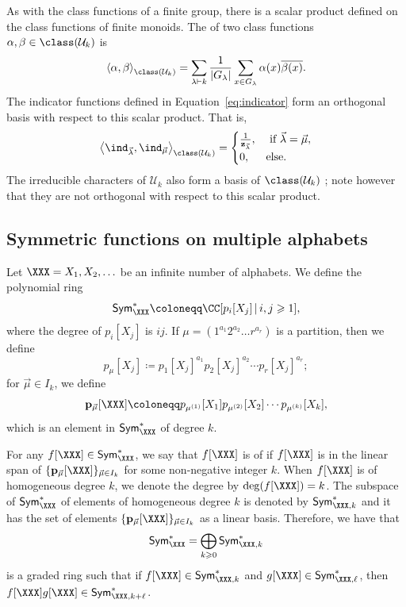 As with the class functions of a finite group, there is a scalar product
defined on the class functions of finite monoids.
The  of two class functions $\alpha, \beta \in \class(\mathcal{U}_k)$
is
\begin{equation}\label{eq:defspclass}
\left< \alpha, \beta \right>_{\class(\mathcal{U}_k)} =
\sum_{\lambda \vdash k} \frac{1}{|G_{\lambda}|} \sum_{x \in G_{\lambda}} \alpha(x) \overline{\beta(x)}.
\end{equation}
The indicator functions defined in Equation~\ref{eq:indicator} form an orthogonal basis
with respect to this scalar product.  That is,
$$
    \left< \ind_{\vec{\lambda}}, \ind_{\vec{\mu}} \right>_{\class(\mathcal{U}_k)}
    = \begin{cases}\frac{1}{\mathbf{z}_{\vec{\lambda}}}, &\hbox{ if }\vec{\lambda} = \vec{\mu},\\
    0, & \hbox{else.}\end{cases}
$$
The irreducible characters of $\mathcal{U}_k$ also form a basis of $\class(\mathcal{U}_k)$
\cite[Proposition 7.9 and 7.10]{Steinberg.2016};
note however that they are not orthogonal with respect to this
scalar product.

\subsection{Symmetric functions on multiple alphabets}
Let $\XXX = X_1, X_2, \ldots$ be an infinite number of alphabets.  We define the polynomial ring
\[
    \mathsf{Sym}^\ast_\XXX \coloneqq \CC[p_i[X_j]\, |\, i,j\geqslant 1],
\]
where the degree of $p_i[X_j]$ is $ij$.  If $\mu = (1^{a_1}2^{a_2}\ldots r^{a_r})$ is a partition,
then we define
$$p_\mu[X_j] \coloneqq p_1[X_j]^{a_1} p_2[X_j]^{a_2} \cdots p_r[X_j]^{a_r};$$
for $\vec{\mu} \in I_k$, we define
$$\mathbf{p}_{\vec{\mu}}[\XXX] \coloneqq p_{\mu^{(1)}}[X_1] p_{\mu^{(2)}}[X_2] \cdots p_{\mu^{(k)}}[X_k],$$
which is an element in $\mathsf{Sym}^\ast_\XXX$ of degree $k$.

For any $f[\XXX] \in \mathsf{Sym}^\ast_\XXX$, we say that $f[\XXX]$ is of  if
$f[\XXX]$ is in the linear span of $\{ \mathbf{p}_{\vec{\mu}}[\XXX] \}_{\vec{\mu} \in I_k}$
for some non-negative integer $k$.
When $f[\XXX]$ is of homogeneous degree $k$, we denote the degree by $\deg(f[\XXX]) = k$.
The subspace of $\mathsf{Sym}^\ast_\XXX$ of elements of homogeneous degree $k$ is denoted by
$\mathsf{Sym}^\ast_{\XXX,k}$ and it has the set of elements $\{ \mathbf{p}_{\vec{\mu}}[\XXX] \}_{\vec{\mu} \in I_k}$ as a linear basis. Therefore, we have that
\[
    \mathsf{Sym}^\ast_\XXX = \bigoplus_{k \geqslant 0} \mathsf{Sym}^\ast_{\XXX,k}
\]
is a graded ring such that if $f[\XXX] \in \mathsf{Sym}^\ast_{\XXX,k}$ and $g[\XXX] \in \mathsf{Sym}^\ast_{\XXX,\ell}$, then $f[\XXX] g[\XXX] \in 
\mathsf{Sym}^\ast_{\XXX,k+\ell}$.


